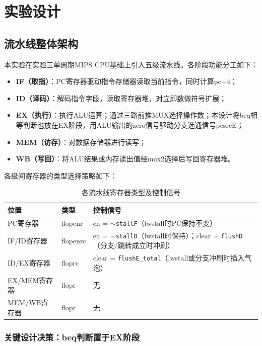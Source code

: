 \section{实验设计}

\subsection{流水线整体架构}

本实验在实验三单周期MIPS CPU基础上引入五级流水线。各阶段功能分工如下：

\begin{itemize}
    \item \textbf{IF（取指）}：PC寄存器驱动指令存储器读取当前指令，同时计算pc+4；
    \item \textbf{ID（译码）}：解码指令字段，读取寄存器堆，对立即数做符号扩展；
    \item \textbf{EX（执行）}：执行ALU运算；通过三路前推MUX选择操作数；本设计将beq相等判断也放在EX阶段，用ALU输出的zero信号驱动分支选通信号pcsrcE；
    \item \textbf{MEM（访存）}：对数据存储器进行读写；
    \item \textbf{WB（写回）}：将ALU结果或内存读出值经mux2选择后写回寄存器堆。
\end{itemize}

各级间寄存器的类型选择策略如下：

\begin{table}[htp]
\caption{各流水线寄存器类型及控制信号}\label{tab:pipereg}
\centering
\begin{tabular}{|l|l|p{7.5cm}|}
\hline
\textbf{位置} & \textbf{类型} & \textbf{控制信号} \\ \hline\hline
PC寄存器       & flopenr  & en = \texttt{$\sim$stallF}（lwstall时PC保持不变） \\ \hline
IF/ID寄存器    & flopenrc & en = \texttt{$\sim$stallD}（lwstall时保持）；\newline clear = \texttt{flushD}（分支/跳转成立时冲刷） \\ \hline
ID/EX寄存器    & floprc   & clear = \texttt{flushE\_total}（lwstall或分支冲刷时插入气泡） \\ \hline
EX/MEM寄存器   & flopr    & 无 \\ \hline
MEM/WB寄存器   & flopr    & 无 \\ \hline
\end{tabular}
\end{table}

\subsubsection{关键设计决策：beq判断置于EX阶段}

